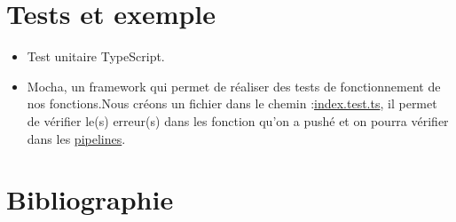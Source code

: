 \documentclass{article}[a4paper, 12pt]
\begin{document}
\section{Tests et exemple}
\begin{itemize}
    \item Test unitaire TypeScript.
    \item Mocha, un framework qui permet de réaliser des tests de fonctionnement de nos fonctions.Nous créons un fichier dans le chemin :\href{https://gitlab.emi.u-bordeaux.fr/vsamson/desert-fox/-/blob/main/src/backend/src/test/index.test.ts}{index.test.ts}, il permet de vérifier le(s) erreur(s) dans les fonction qu'on a pushé et on pourra vérifier dans les \href{https://gitlab.emi.u-bordeaux.fr/vsamson/desert-fox/-/pipelines}{pipelines}.
    
    
\end{itemize}

\section{Bibliographie}



\end{document}
